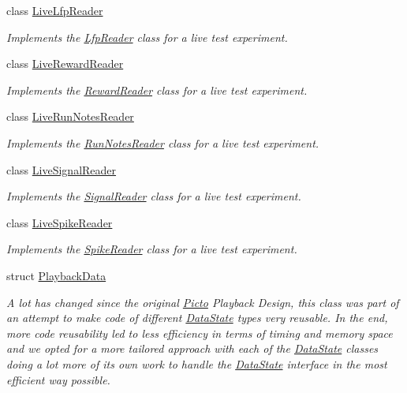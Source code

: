 \begin{DoxyCompactItemize}
class \hyperlink{class_picto_1_1_live_lfp_reader}{Live\-Lfp\-Reader}
\begin{DoxyCompactList}\small\item\em Implements the \hyperlink{class_picto_1_1_lfp_reader}{Lfp\-Reader} class for a live test experiment. \end{DoxyCompactList}\item 
class \hyperlink{class_picto_1_1_live_reward_reader}{Live\-Reward\-Reader}
\begin{DoxyCompactList}\small\item\em Implements the \hyperlink{class_picto_1_1_reward_reader}{Reward\-Reader} class for a live test experiment. \end{DoxyCompactList}\item 
class \hyperlink{class_picto_1_1_live_run_notes_reader}{Live\-Run\-Notes\-Reader}
\begin{DoxyCompactList}\small\item\em Implements the \hyperlink{class_picto_1_1_run_notes_reader}{Run\-Notes\-Reader} class for a live test experiment. \end{DoxyCompactList}\item 
class \hyperlink{class_picto_1_1_live_signal_reader}{Live\-Signal\-Reader}
\begin{DoxyCompactList}\small\item\em Implements the \hyperlink{class_picto_1_1_signal_reader}{Signal\-Reader} class for a live test experiment. \end{DoxyCompactList}\item 
class \hyperlink{class_picto_1_1_live_spike_reader}{Live\-Spike\-Reader}
\begin{DoxyCompactList}\small\item\em Implements the \hyperlink{class_picto_1_1_spike_reader}{Spike\-Reader} class for a live test experiment. \end{DoxyCompactList}\item 
struct \hyperlink{struct_picto_1_1_playback_data}{Playback\-Data}
\begin{DoxyCompactList}\small\item\em A lot has changed since the original \hyperlink{namespace_picto}{Picto} Playback Design, this class was part of an attempt to make code of different \hyperlink{class_picto_1_1_data_state}{Data\-State} types very reusable. In the end, more code reusability led to less efficiency in terms of timing and memory space and we opted for a more tailored approach with each of the \hyperlink{class_picto_1_1_data_state}{Data\-State} classes doing a lot more of its own work to handle the \hyperlink{class_picto_1_1_data_state}{Data\-State} interface in the most efficient way possible. \end{DoxyCompactList}\item 

\end{DoxyCompactItemize}
